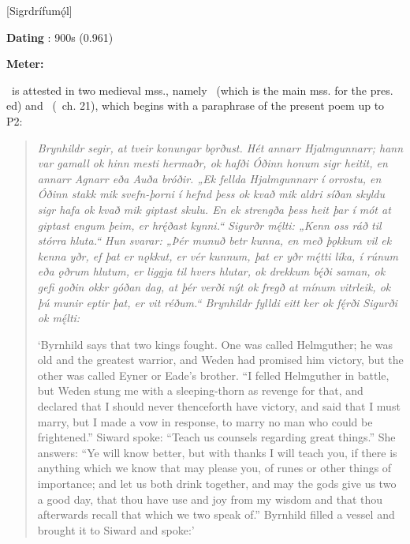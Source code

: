 [Sigrdrífumǫ́l]

\begin{flushright}%
\textbf{Dating} \parencite{Sapp2022}: 900s (0.961)

\textbf{Meter:} \Ljodahattr%
\end{flushright}



\Sigrdrifumal\ is attested in two medieval mss., namely \Regius\ (which is the main mss. for the pres. ed) and \VolsungaMS\ (\VolsungaSaga\ ch. 21), which begins with a paraphrase of the present poem up to P2:

\begin{quote}
  \emph{Brynhildr segir, at tveir konungar bǫrðust. Hét annarr Hjalmgunnarr; hann var gamall ok hinn mesti hermaðr, ok hafði Óðinn honum sigr heitit, en annarr Agnarr eða Auða bróðir. „Ek fellda Hjalmgunnarr í orrostu, en Óðinn stakk mik svefn-þorni í hefnd þess ok kvað mik aldri síðan skyldu sigr hafa ok kvað mik giptast skulu. En ek strengða þess heit þar í mót at giptast engum þeim, er hrę́ðast kynni.“ Sigurðr mę́lti: „Kenn oss ráð til stórra hluta.“ Hun svarar: „Þér munuð betr kunna, en með þǫkkum vil ek kenna yðr, ef þat er nǫkkut, er vér kunnum, þat er yðr mę́tti líka, í rúnum eða ǫðrum hlutum, er liggja til hvers hlutar, ok drekkum bę́ði saman, ok gefi goðin okkr góðan dag, at þér verði nýt ok fregð at mínum vitrleik, ok þú munir eptir þat, er vit réðum.“ Brynhildr fylldi eitt ker ok fę́rði Sigurði ok mę́lti:}

  ‘Byrnhild says that two kings fought. One was called Helmguther; he was old and the greatest warrior, and Weden had promised him victory,
  but the other was called Eyner or Eade’s brother. “I felled Helmguther in battle, but Weden stung me with a sleeping-thorn as revenge for that, and declared that I should never thenceforth have victory, and said that I must marry, but I made a vow in response, to marry no man who could be frightened.” Siward spoke: “Teach us counsels regarding great things.” She answers: “Ye will know better, but with thanks I will teach you, if there is anything which we know that may please you, of runes or other things of importance; and let us both drink together, and may the gods give us two a good day, that thou have use and joy from my wisdom and that thou afterwards recall that which we two speak of.” Byrnhild filled a vessel and brought it to Siward and spoke:’
\end{quote}


